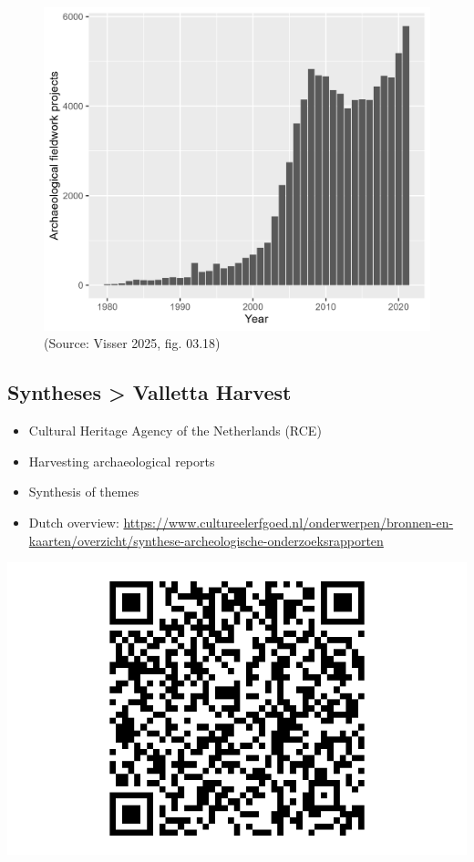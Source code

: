 \documentclass[
  letterpaper,
  DIV=11,
  numbers=noendperiod]{scrartcl}
\providecommand{\tightlist}{%
  \setlength{\itemsep}{0pt}\setlength{\parskip}{0pt}}\usepackage{longtable,booktabs,array}
\begin{document}
\begin{figure}

{\centering \includegraphics{images/Figure_03.18_archaeological_research_nl.png}

}

\caption{(Source: Visser 2025, fig. 03.18)}

\end{figure}

\hypertarget{syntheses-valletta-harvest}{%
\subsection{Syntheses \textgreater{} Valletta
Harvest}\label{syntheses-valletta-harvest}}

\begin{itemize}
\tightlist
\item
  Cultural Heritage Agency of the Netherlands (RCE)
\item
  Harvesting archaeological reports
\item
  Synthesis of themes
\item
  Dutch overview:
  \url{https://www.cultureelerfgoed.nl/onderwerpen/bronnen-en-kaarten/overzicht/synthese-archeologische-onderzoeksrapporten}
\end{itemize}

\includegraphics{index_files/figure-pdf/unnamed-chunk-1-1.pdf}
\end{document}
